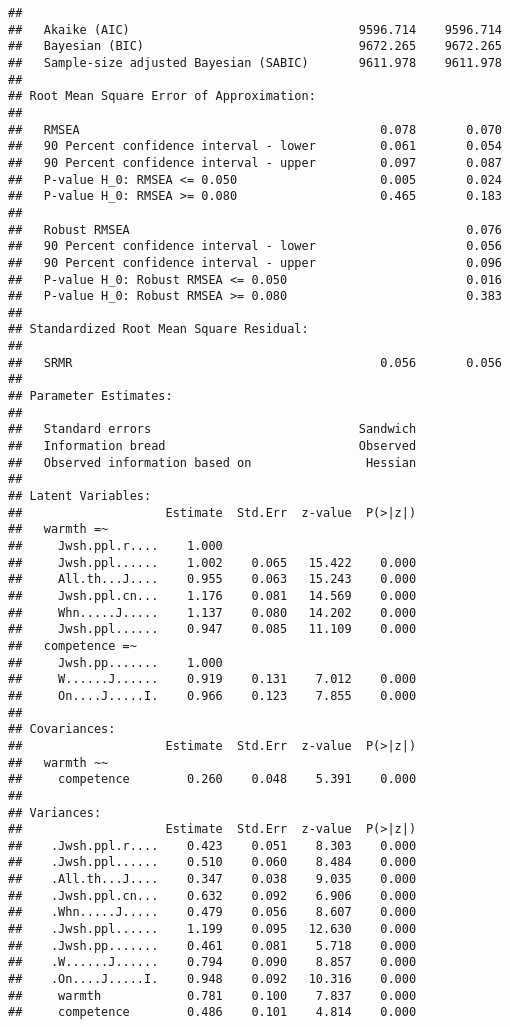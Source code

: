 \documentclass[
  doc,draftall]{apa6}
\begin{document}
\begin{verbatim}
##                                                                   
##   Akaike (AIC)                                9596.714    9596.714
##   Bayesian (BIC)                              9672.265    9672.265
##   Sample-size adjusted Bayesian (SABIC)       9611.978    9611.978
## 
## Root Mean Square Error of Approximation:
## 
##   RMSEA                                          0.078       0.070
##   90 Percent confidence interval - lower         0.061       0.054
##   90 Percent confidence interval - upper         0.097       0.087
##   P-value H_0: RMSEA <= 0.050                    0.005       0.024
##   P-value H_0: RMSEA >= 0.080                    0.465       0.183
##                                                                   
##   Robust RMSEA                                               0.076
##   90 Percent confidence interval - lower                     0.056
##   90 Percent confidence interval - upper                     0.096
##   P-value H_0: Robust RMSEA <= 0.050                         0.016
##   P-value H_0: Robust RMSEA >= 0.080                         0.383
## 
## Standardized Root Mean Square Residual:
## 
##   SRMR                                           0.056       0.056
## 
## Parameter Estimates:
## 
##   Standard errors                             Sandwich
##   Information bread                           Observed
##   Observed information based on                Hessian
## 
## Latent Variables:
##                    Estimate  Std.Err  z-value  P(>|z|)
##   warmth =~                                           
##     Jwsh.ppl.r....    1.000                           
##     Jwsh.ppl......    1.002    0.065   15.422    0.000
##     All.th...J....    0.955    0.063   15.243    0.000
##     Jwsh.ppl.cn...    1.176    0.081   14.569    0.000
##     Whn.....J.....    1.137    0.080   14.202    0.000
##     Jwsh.ppl......    0.947    0.085   11.109    0.000
##   competence =~                                       
##     Jwsh.pp.......    1.000                           
##     W......J......    0.919    0.131    7.012    0.000
##     On....J.....I.    0.966    0.123    7.855    0.000
## 
## Covariances:
##                    Estimate  Std.Err  z-value  P(>|z|)
##   warmth ~~                                           
##     competence        0.260    0.048    5.391    0.000
## 
## Variances:
##                    Estimate  Std.Err  z-value  P(>|z|)
##    .Jwsh.ppl.r....    0.423    0.051    8.303    0.000
##    .Jwsh.ppl......    0.510    0.060    8.484    0.000
##    .All.th...J....    0.347    0.038    9.035    0.000
##    .Jwsh.ppl.cn...    0.632    0.092    6.906    0.000
##    .Whn.....J.....    0.479    0.056    8.607    0.000
##    .Jwsh.ppl......    1.199    0.095   12.630    0.000
##    .Jwsh.pp.......    0.461    0.081    5.718    0.000
##    .W......J......    0.794    0.090    8.857    0.000
##    .On....J.....I.    0.948    0.092   10.316    0.000
##     warmth            0.781    0.100    7.837    0.000
##     competence        0.486    0.101    4.814    0.000
\end{verbatim}
\end{document}

